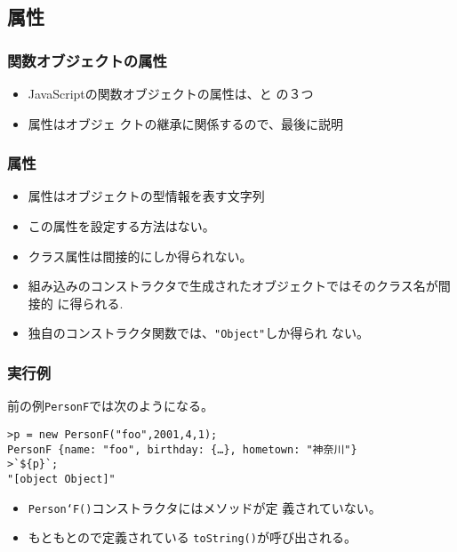 \subsection{\protect{}属性}
\begin{frame}[containsverbatim]
 \frametitle{関数オブジェクトの属性}
 \begin{itemize}
  \item JavaScriptの関数オブジェクトの属性は、と
の３つ
  \item {}属性はオブジェ
クトの継承に関係するので、最後に説明
 \end{itemize}
\end{frame}
\begin{frame}[containsverbatim]
 \frametitle{\protect{}属性}
 \begin{itemize}
  \item {}属性はオブジェクトの型情報を表す文字列
  \item この属性を設定する方法はない。
  \item クラス属性は間接的にしか得られない。
  \item 組み込みのコンストラクタで生成されたオブジェクトではそのクラス名が間接的
        に得られる.
  \item 独自のコンストラクタ関数では、\texttt{"Object"}しか得られ
ない。
 \end{itemize}
\end{frame}
\begin{frame}[containsverbatim]
 \frametitle{実行例}
 前の例\texttt{PersonF}では次のようになる。
 \begin{Verbatim}
>p = new PersonF("foo",2001,4,1);
PersonF {name: "foo", birthday: {…}, hometown: "神奈川"}
>`${p}`;
"[object Object]"
\end{Verbatim}
\begin{itemize}
 \item \texttt{Person`F()}コンストラクタにはメソッドが定
       義されていない。
 \item もともとので定義されている
 \texttt{toString()}が呼び出される。
\end{itemize}
\end{frame}
